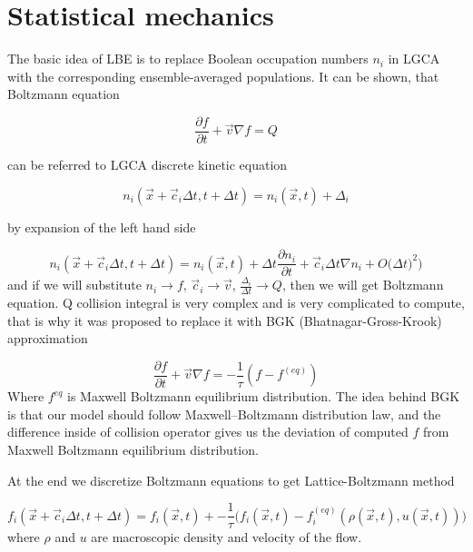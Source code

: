 
\section{Statistical mechanics}

The basic idea of LBE is to replace Boolean occupation numbers $n_i$ in LGCA with the corresponding ensemble-averaged populations. It can be shown, that Boltzmann equation

\begin{equation}
\frac{\partial f}{\partial t} + \overrightarrow{v} \nabla f = Q
\end{equation}

can be referred to LGCA discrete kinetic equation

\begin{equation}
n_i(\overrightarrow{x} + \overrightarrow{c}_i \Delta t, t + \Delta t) = n_i(\overrightarrow{x},t) +\Delta_i
\end{equation}

by expansion of the left hand side

\begin{equation}
n_i(\overrightarrow{x} + \overrightarrow{c}_i \Delta t, t + \Delta t) = n_i(\overrightarrow{x},t) + \Delta t \frac{\partial n_i}{\partial t} + \overrightarrow{c}_i \Delta{t} \nabla{n_i} + O\big(\Delta t)^2\big)
\end{equation}
and if we will substitute $n_i \rightarrow f$, $\overrightarrow{c}_i \rightarrow \overrightarrow{v}$, $\frac{\Delta_i}{\Delta t} \rightarrow Q$, then we will get Boltzmann equation. Q collision integral is very complex and is very complicated to compute, that is why it was proposed to replace it with BGK (Bhatnagar-Gross-Krook) approximation

\begin{equation}
\frac{\partial f}{\partial t} + \overrightarrow{v} \nabla f = -\frac{1}{\tau}(f - f^{(eq)})
\end{equation}
Where $f^{eq}$ is Maxwell Boltzmann equilibrium distribution. The idea behind BGK is that our model should follow Maxwell–Boltzmann distribution law, and the difference inside of collision operator gives us the deviation of computed $f$ from  Maxwell Boltzmann equilibrium distribution.

At the end we discretize Boltzmann equations to get Lattice-Boltzmann method

\begin{equation}
f_i(\overrightarrow{x} + \overrightarrow{c}_i \Delta t, t + \Delta t) = f_i(\overrightarrow{x},t) + -\frac{1}{\tau} \big(f_i(\overrightarrow{x},t) - f_i^{(eq)}(\rho(\overrightarrow{x},t), u(\overrightarrow{x},t))\big)
\end{equation}
where $\rho$ and $u$ are macroscopic density and velocity of the flow.

